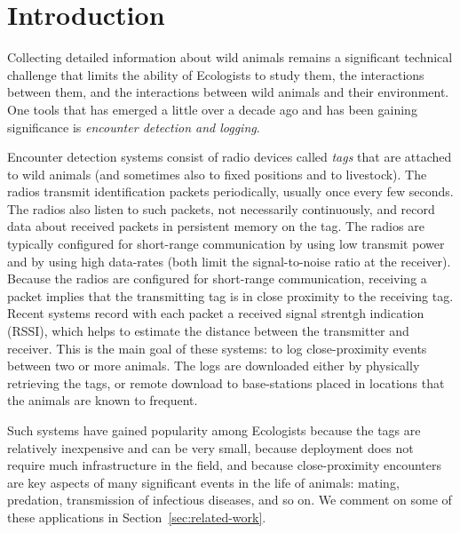 \section{Introduction}

Collecting detailed information about wild animals remains a significant technical challenge that
limits the ability of Ecologists to study them, the interactions between them, and the interactions 
between wild animals and their environment. One tools that has emerged a little over a decade ago
and has been gaining significance is {\em encounter detection and logging}.

Encounter detection systems consist of radio devices called {\em tags} that are attached to wild
animals (and sometimes also to fixed positions and to livestock). The radios transmit identification
packets periodically, usually once every few seconds. The radios also listen to such packets, not
necessarily continuously, and record data about received packets in persistent memory on the tag. The
radios are typically configured for short-range communication by using low transmit power and by 
using high data-rates (both limit the signal-to-noise ratio at the receiver). Because the radios
are configured for short-range communication, receiving a packet implies that the transmitting tag is
in close proximity to the receiving tag. Recent systems record with each packet a received signal strentgh
indication (RSSI), which helps to estimate the distance between the transmitter and receiver.
This is the main goal of these systems: to log close-proximity
events between two or more animals. The logs are downloaded either by physically retrieving the tags,
or remote download to base-stations placed in locations that the animals are known to frequent.

Such systems have gained popularity among Ecologists because the tags are relatively inexpensive and can
be very small, because deployment does not require much infrastructure in the field, and because close-proximity
encounters are key aspects of many significant events in the life of animals: mating, predation, transmission of infectious
diseases, and so on. We comment on some of these applications in Section~\ref{sec:related-work}.



 

